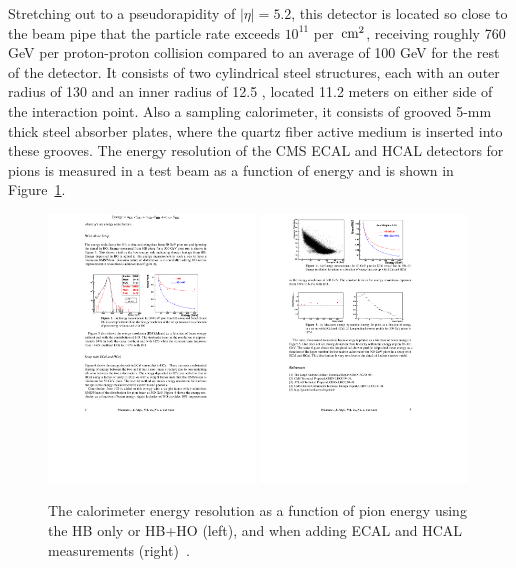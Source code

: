 Stretching out to a pseudorapidity of $|\eta|= 5.2$, this detector is located so close to the beam pipe that the particle rate exceeds $10^{11}$ per $\,\text{cm}^2$, receiving roughly 760 GeV per proton-proton collision compared to an average of 100 GeV for the rest of the detector. It consists of two cylindrical steel structures, each with an outer radius of 130 \cm and an inner radius of 12.5 \cm, located 11.2 meters on either side of the interaction point. Also a sampling calorimeter, it consists of grooved 5-mm thick steel absorber plates, where the quartz fiber active medium is inserted into these grooves.
The energy resolution of the CMS ECAL and HCAL detectors for pions is measured in a test beam as a function of energy and is shown in Figure~\ref{fig:cms:hcal-res}.
\begin{figure}[h!] 
    \centering
    \includegraphics[width=0.49\textwidth]{figures/cms/hcal_res.pdf}
    \includegraphics[width=0.49\textwidth]{figures/cms/hcal_ecal_res.pdf}
    \caption{The calorimeter energy resolution as a function of pion energy using the HB only or HB+HO (left), and when adding ECAL and HCAL measurements (right)~\cite{Sharma2007}.}
    \label{fig:cms:hcal-res}
\end{figure}

